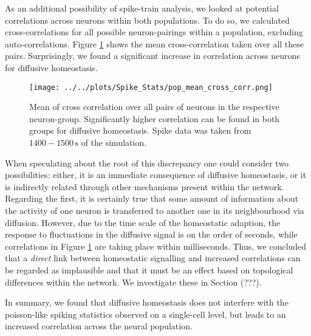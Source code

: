 \documentclass[10pt,a4paper]{article}
\begin{document}
As an additional possibility of spike-train analysis, we looked at potential correlations across neurons within both populations. To do so, we calculated cross-correlations for all possible neuron-pairings within a population, excluding auto-correlations. Figure \ref{Pop_Mean_Cross_Corr} shows the mean cross-correlation taken over all these pairs. Surprisingly, we found a significant increase in correlation across neurons for diffusive homeostasis. 
\begin{figure}
\texttt{[image: ../../plots/Spike\_Stats/pop\_mean\_cross\_corr.png]}
\caption{Mean of cross correlation over all pairs of neurons in the respective neuron-group. Significantly higher correlation can be found in both groups for diffusive homeostasis. Spike data was taken from $\mathrm{1400-1500\,s}$ of the simulation.}
\label{Pop_Mean_Cross_Corr}
\end{figure}
When speculating about the root of this discrepancy one could consider two possibilities: either, it is an immediate consequence of diffusive homeostasis, or it is indirectly related through other mechanisms present within the network. Regarding the first, it is certainly true that some amount of information about the activity of one neuron is transferred to another one in its neighbourhood via diffusion. However, due to the time scale of the homeostatic adaption, the response to fluctuations in the diffusive signal is on the order of seconds, while correlations in Figure \ref{Pop_Mean_Cross_Corr} are taking place within milliseconds. Thus, we concluded that a \emph{direct} link between homeostatic signalling and increased correlations can be regarded as implausible and that it must be an effect based on topological differences within the network. We investigate these in Section (???).

In summary, we found that diffusive homeostasis does not interfere with the poisson-like spiking statistics observed on a single-cell level, but leads to an increased correlation across the neural population. 
\end{document}

